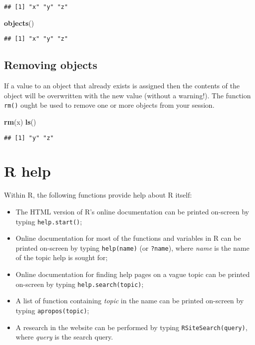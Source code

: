 \documentclass[]{book}
\newenvironment{Shaded}{\begin{snugshade}}{\end{snugshade}}
\newcommand{\KeywordTok}[1]{\textcolor[rgb]{0.13,0.29,0.53}{\textbf{{#1}}}}
\newcommand{\NormalTok}[1]{{#1}}
\providecommand{\tightlist}{%
  \setlength{\itemsep}{0pt}\setlength{\parskip}{0pt}}
\def\tightlist{}
\begin{document}
\begin{verbatim}
## [1] "x" "y" "z"
\end{verbatim}

\begin{Shaded}
\begin{Highlighting}[]
\KeywordTok{objects}\NormalTok{()}
\end{Highlighting}
\end{Shaded}

\begin{verbatim}
## [1] "x" "y" "z"
\end{verbatim}

\subsection{Removing objects}\label{removing-objects}

If a value to an object that already exists is assigned then the
contents of the object will be overwritten with the new value (without a
warning!). The function \texttt{rm()} ought be used to remove one or
more objects from your session.

\begin{Shaded}
\begin{Highlighting}[]
\KeywordTok{rm}\NormalTok{(x)}
\KeywordTok{ls}\NormalTok{()}
\end{Highlighting}
\end{Shaded}

\begin{verbatim}
## [1] "y" "z"
\end{verbatim}

\section{R help}\label{r-help}

Within R, the following functions provide help about R itself:

\begin{itemize}
\tightlist
\item
  The HTML version of R's online documentation can be printed on-screen
  by typing \texttt{help.start()};
\item
  Online documentation for most of the functions and variables in R can
  be printed on-screen by typing \texttt{help(name)} (or
  \texttt{?name}), where \emph{name} is the name of the topic help is
  sought for;
\item
  Online documentation for finding help pages on a vague topic can be
  printed on-screen by typing
  \texttt{help.search(\textquotesingle{}topic\textquotesingle{})};
\item
  A list of function containing \emph{topic} in the name can be printed
  on-screen by typing
  \texttt{apropos(\textquotesingle{}topic\textquotesingle{})};
\item
  A research in the website can be performed by typing
  \texttt{RSiteSearch(\textquotesingle{}query\textquotesingle{})}, where
  \emph{query} is the search query.
\end{itemize}
\end{document}
